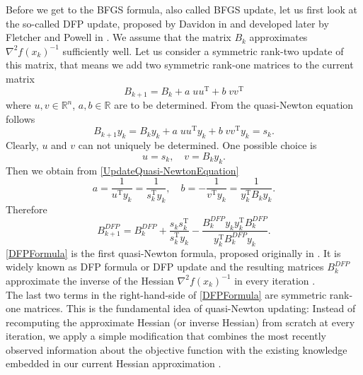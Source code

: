 Before we get to the BFGS formula, also called BFGS update, let us first look at the so-called DFP update, proposed by Davidon in \cite{Davidon:1959} and developed later by Fletcher and Powell in \cite{FletcherPowell:1963}. We assume that the matrix $B_k$ approximates $\nabla^2 f(x_k)^{-1}$ sufficiently well. Let us consider a symmetric rank-two update of this matrix, that means we add two symmetric rank-one matrices to the current matrix
\begin{equation*}
    B_{k+1} = B_k + a \; uu^{\mathrm{T}} + b \; vv^{\mathrm{T}}
\end{equation*}
where $u,v \in \mathbb{R}^n$, $a,b \in \mathbb{R}$ are to be determined. From the quasi-Newton equation follows
\begin{equation}\label{UpdateQuasi-NewtonEquation}
    B_{k+1} y_k = B_k y_k + a \; uu^{\mathrm{T}} y_k + b \; vv^{\mathrm{T}} y_k = s_k.
\end{equation}
Clearly, $u$ and $v$ can not uniquely be determined. One possible choice is
\begin{equation*}
    u = s_k, \quad v = B_k y_k.
\end{equation*}
Then we obtain from \cref{UpdateQuasi-NewtonEquation}
\begin{equation*}
    a = \frac{1}{u^{\mathrm{T}} y_k} = \frac{1}{s^{\mathrm{T}}_k y_k}, \quad b = - \frac{1}{v^{\mathrm{T}} y_k} = \frac{1}{y^{\mathrm{T}}_k B_k y_k}.
\end{equation*}
Therefore
\begin{equation}\label{DFPFormula}
    B^{DFP}_{k+1} = B^{DFP}_k + \frac{s_k s^{\mathrm{T}}_k}{s^{\mathrm{T}}_k y_k} - \frac{B^{DFP}_k y_k y^{\mathrm{T}}_k B^{DFP}_k}{y^{\mathrm{T}}_k B^{DFP}_k y_k}.
\end{equation}
\cref{DFPFormula} is the first quasi-Newton formula, proposed originally in \cite{Davidon:1959}. It is widely known as DFP formula or DFP update and the resulting matrices $B^{DFP}_k$ approximate the inverse of the Hessian $\nabla^2 f(x_k)^{-1}$ in every iteration \cite[p.~210]{SunYuan:2006}. \\
The last two terms in the right-hand-side of \cref{DFPFormula} are symmetric rank-one matrices. This is the fundamental idea of quasi-Newton updating: Instead of recomputing the approximate Hessian (or inverse Hessian) from scratch at every iteration, we apply a simple modification that combines the most recently observed information about the objective function with the existing knowledge embedded in our current Hessian approximation \cite[p.~139]{NocedalWright:2006}. \\
